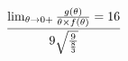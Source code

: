 \documentclass[preview]{standalone}
\begin{document}
\begin{align*}
\lim_{\theta \to 0 +} {g( \theta ) \over {\theta \times f( \theta )}} =  16 \over 9\sqrt{9  \over {8 \over 3}}
\end{align*}
\end{document}
